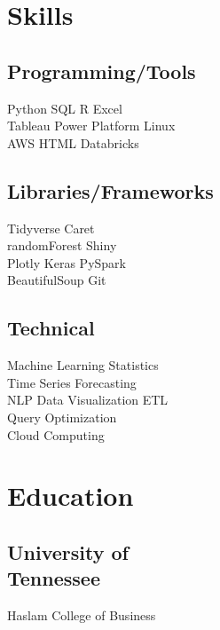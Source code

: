 \documentclass[]{plushcv}
\begin{document}
\begin{minipage}[t]{0.25\textwidth} 


\section{Skills}
\subsection{Programming/Tools}
\sectionsep
{}
Python \textbullet{} SQL \textbullet{} R \textbullet{} Excel \\
\sectionsep
{}
Tableau \textbullet{} Power Platform \textbullet{} Linux  \\
\sectionsep
{}
AWS \textbullet{} HTML \textbullet{} Databricks  \\
\sectionsep
\sectionsep
\subsection{Libraries/Frameworks}
\sectionsep
Tidyverse \textbullet{} Caret \textbullet{} \\ 
randomForest \textbullet{} Shiny \textbullet{} \\
Plotly \textbullet{} Keras \textbullet{} PySpark \textbullet{} \\
BeautifulSoup \textbullet{} Git 

\sectionsep
\sectionsep
\subsection{Technical}
\sectionsep
Machine Learning \textbullet{} Statistics \\
Time Series Forecasting \textbullet{} \\
NLP  \textbullet{} Data Visualization \textbullet{} ETL \\
Query Optimization \textbullet{} \\ 
Cloud Computing

\sectionsep


\section{Education} 
\subsection{University of 
\\Tennessee}
Haslam College of Business \\


\end{minipage}
\end{document}
